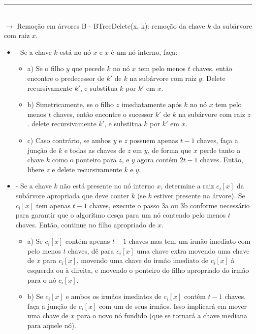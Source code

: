 \documentclass[a4paper, 12pt]{article}
\begin{document}
\rule{12cm}{0.4pt}\\

$\rightarrow$ Remoção em árvores B - BTreeDelete(x, k): remoção da chave $k$ da subárvore com raiz $x$.

\begin{itemize}

\item {} - Se a chave $k$ está no nó $x$ e $x$ é um nó interno, faça:

\begin{itemize}
\item a) Se o filho $y$ que pecede $k$ no nó $x$ tem pelo menos $t$ chaves, então encontre o predecessor de $k'$ de $k$ na subárvore com raiz $y$. Delete recursivamente $k'$, e substitua $k$ por $k'$ em $x$.

\item b) Simetricamente, se o filho $z$ imediatamente após $k$ no nó $x$ tem pelo menos $t$ chaves, então encontre o sucessor $k'$ de $k$ na subárvore com raiz $z$. delete recursivamente $k'$, e substitua $k$ por $k'$ em $x$.

\item c) Caso contrário, se ambos $y$ e $z$ possuem apenas $t-1$ chaves, faça a junção de $k$ e todas as chaves de $z$ em $y$, de forma que $x$ perde tanto a chave $k$ como o ponteiro para $z$, e $y$ agora contém $2t-1$ chaves. Então, libere $z$ e delete recursivamente $k$ e $y$.
\end{itemize}

\item {} - Se a chave $k$ não está presente no nó interno $x$, determine a raiz $c_{i}[x]$ da subárvore apropriada que deve conter $k$ (se $k$ estiver presente na árvore). Se $c_{i}[x]$ tem apenas $t-1$ chaves, execute o passo 3a ou 3b conforme necessário para garantir que o algoritmo desça para um nó contendo pelo menos $t$ chaves. Então, continue no filho apropriado de $x$.

\begin{itemize}
\item a) Se $c_{i}[x]$ contém apenas $t-1$ chaves mas tem um irmão imediato com pelo menos $t$ chaves, dê para $c_{i}[x]$ uma chave extra movendo uma chave de $x$ para $c_{i}[x]$, movendo uma chave do irmão imediato de $c_{i}[x]$ à esquerda ou à direita, e movendo o ponteiro do filho apropriado do irmão para o nó $c_{i}[x]$.

\item b) Se $c_{i}[x]$ e ambos os irmãos imediatos de $c_{i}[x]$ contêm $t-1$ chaves, faça a junção de $c_{i}[x]$ com um de seus irmãos. Isso implicará em mover uma chave de $x$ para o novo nó fundido (que se tornará a chave mediana para aquele nó).
\end{itemize}


\end{itemize}
\end{document}
